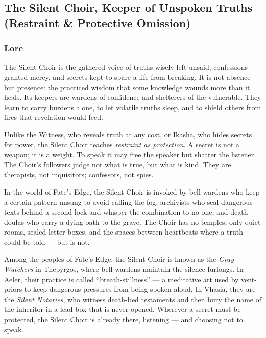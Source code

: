 
\subsection{The Silent Choir, Keeper of Unspoken Truths (Restraint \& Protective Omission)}

\subsubsection*{Lore}
The Silent Choir is the gathered voice of truths wisely left unsaid, confessions granted mercy, and secrets kept to spare a life from breaking. It is not absence but presence: the practiced wisdom that some knowledge wounds more than it heals. Its keepers are wardens of confidence and shelterers of the vulnerable. They learn to carry burdens alone, to let volatile truths sleep, and to shield others from fires that revelation would feed.

Unlike the Witness, who reveals truth at any cost, or Ikasha, who hides secrets for power, the Silent Choir teaches \textit{restraint as protection}. A secret is not a weapon; it is a weight. To speak it may free the speaker but shatter the listener. The Choir's followers judge not what is true, but what is kind. They are therapists, not inquisitors; confessors, not spies.

In the world of Fate's Edge, the Silent Choir is invoked by bell-wardens who keep a certain pattern unsung to avoid calling the fog, archivists who seal dangerous texts behind a second lock and whisper the combination to no one, and death-doulas who carry a dying oath to the grave. The Choir has no temples, only quiet rooms, sealed letter-boxes, and the spaces between heartbeats where a truth could be told --- but is not.

Among the peoples of Fate's Edge, the Silent Choir is known as the \textit{Gray Watchers} in Thepyrgos, where bell-wardens maintain the silence furlongs. In Aeler, their practice is called ``breath-stillness'' --- a meditative art used by vent-priors to keep dangerous pressures from being spoken aloud. In Vhasia, they are the \textit{Silent Notaries}, who witness death-bed testaments and then bury the name of the inheritor in a lead box that is never opened. Wherever a secret must be protected, the Silent Choir is already there, listening --- and choosing not to speak.


